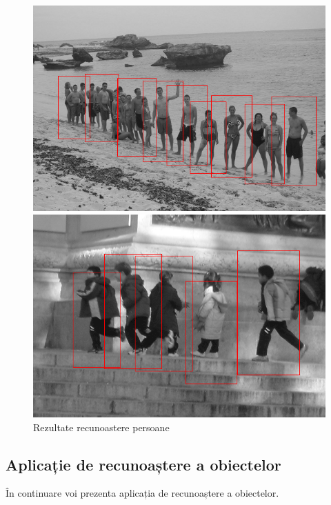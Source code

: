 \begin{figure}[H]
\begin{center}
	\includegraphics[width=1.00\textwidth]{imagini/rezultate2.png}
\end{center}
\begin{center}
	\includegraphics[width=1.00\textwidth]{imagini/rezultate3.png}
\end{center}
	\caption{Rezultate recunoastere persoane}
	\label{fig:rezultate_recunoaster_pers2}
\end{figure}

\subsection{Aplicație de recunoaștere a obiectelor}

În continuare voi prezenta aplicația de recunoaștere a obiectelor.

